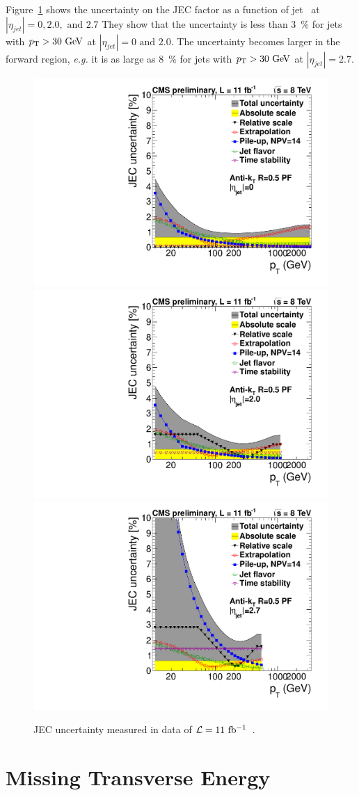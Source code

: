 Figure~\ref{fig:jecuncert} shows the uncertainty on the JEC factor
as a function of jet \pt\ at $|\eta_{jet}|=0, 2.0, \textrm{ and }2.7$ 
They show that the uncertainty is less than 3~\% for jets with 
$p_\mathrm{T}>30~\mathrm{Ge\kern -0.1em V}$ at $|\eta_{jet}|=0 \textrm{ and } 2.0$. 
The uncertainty becomes larger in the forward region, 
\textit{e.g.} it is as large as 8~\% for jets with $p_\mathrm{T}>30~\mathrm{Ge\kern -0.1em V}$ at $|\eta_{jet}|=2.7$.  


\begin{figure}[!hbtp]
\centering
\includegraphics[width=.45\textwidth]{figures/JECUncert_Fall12_DATA_AK5PF_Eta00.pdf}
\includegraphics[width=.45\textwidth]{figures/JECUncert_Fall12_DATA_AK5PF_Eta20.pdf} \\
\includegraphics[width=.45\textwidth]{figures/JECUncert_Fall12_DATA_AK5PF_Eta27.pdf} 
\caption{JEC uncertainty measured in data of $\mathcal{L}=11~\mathrm{fb^{-1}}$~\cite{DPS-2013-011}.}
\label{fig:jecuncert}
\end{figure}



\section{ Missing Transverse Energy }

